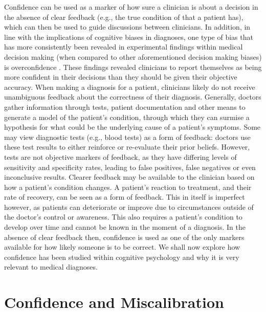 \documentclass[a4paper, nobind]{templates/ociamthesis}
\begin{document}
\hfill\break
Confidence can be used as a marker of how sure a clinician is about a decision in the absence of clear feedback (e.g., the true condition of that a patient has), which can then be used to guide discussions between clinicians. In addition, in line with the implications of cognitive biases in diagnoses, one type of bias that has more consistently been revealed in experimental findings within medical decision making (when compared to other aforementioned decision making biases) is overconfidence \autocite{berner_overconfidence_2008,meyer_physicians_2013}. These findings revealed clinicians to report themselves as being more confident in their decisions than they should be given their objective accuracy. When making a diagnosis for a patient, clinicians likely do not receive unambiguous feedback about the correctness of their diagnosis. Generally, doctors gather information through tests, patient documentation and other means to generate a model of the patient's condition, through which they can surmise a hypothesis for what could be the underlying cause of a patient's symptoms. Some may view diagnostic tests (e.g., blood tests) as a form of feedback: doctors use these test results to either reinforce or re-evaluate their prior beliefs. However, tests are not objective markers of feedback, as they have differing levels of sensitivity and specificity rates, leading to false positives, false negatives or even inconclusive results. Clearer feedback may be available to the clinician based on how a patient's condition changes. A patient's reaction to treatment, and their rate of recovery, can be seen as a form of feedback. This in itself is imperfect however, as patients can deteriorate or improve due to circumstances outside of the doctor's control or awareness. This also requires a patient's condition to develop over time and cannot be known in the moment of a diagnosis. In the absence of clear feedback then, confidence is used as one of the only markers available for how likely someone is to be correct. We shall now explore how confidence has been studied within cognitive psychology and why it is very relevant to medical diagnoses.

\section{Confidence and Miscalibration}\label{confidence-and-miscalibration}
\end{document}
